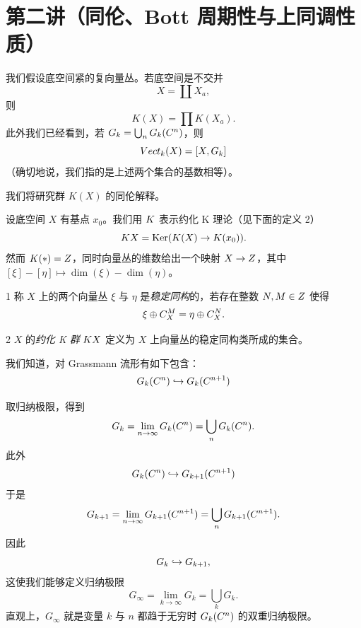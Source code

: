 
\section{第二讲（同伦、Bott 周期性与上同调性质）}

我们假设底空间紧的复向量丛。若底空间是不交并
\[ X = \coprod X_a, \]
则
\[ K(X) = \prod K(X_a). \]
此外我们已经看到，若 $G_k = \bigcup_n G_k(C^n)$，则
\[ Vect_k(X) = [X, G_k] \]
（确切地说，我们指的是上述两个集合的基数相等）。

我们将研究群 $K(X)$ 的同伦解释。

设底空间 $X$ 有基点 $x_0$。我们用 $ K$ 表示约化 K 理论（见下面的定义 2）
\[  K X = \operatorname{Ker}(K(X)\to K(x_0)). \]
然而 $K(*) = Z$，同时向量丛的维数给出一个映射 $X\to Z$，其中 $[\xi]-[\eta]\mapsto\dim(\xi)-\dim(\eta)$。


\begin{defn}{1}
称 $X$ 上的两个向量丛 $\xi$ 与 $\eta$ 是\emph{稳定同构}的，若存在整数 $N, M\in Z$ 使得
\[ \xi\oplus C^M_X = \eta\oplus C^N_X. \]
\end{defn}

\begin{defn}{2}
$X$ 的\emph{约化 K 群} $ K X$ 定义为 $X$ 上向量丛的稳定同构类所成的集合。
\end{defn}


我们知道，对 Grassmann 流形有如下包含：
\[ G_k(C^n)\hookrightarrow G_k(C^{n+1}) \]

取归纳极限，得到
\[ G_k = \lim_{n\to\infty}G_k(C^n) = \bigcup_n G_k(C^n). \]
此外
\[ G_k(C^n)\hookrightarrow G_{k+1}(C^{n+1}) \]
于是
\[ G_{k+1} = \lim_{n\to\infty}G_{k+1}(C^{n+1}) = \bigcup_n G_{k+1}(C^{n+1}). \]
因此
\[ G_k\hookrightarrow G_{k+1}, \]
这使我们能够定义归纳极限
\[ G_\infty = \lim_{k\to\infty}G_k = \bigcup_k G_k. \]
直观上，$G_\infty$ 就是变量 $k$ 与 $n$ 都趋于无穷时 $G_k(C^n)$ 的双重归纳极限。

